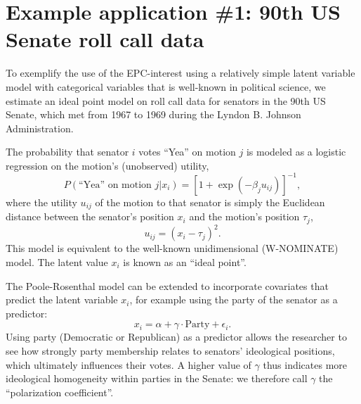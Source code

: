 \documentclass[letterpaper,12pt]{article}
\begin{document}
\section{Example application \#1: 90th US Senate roll call data}
\label{sec:rollcall}

To exemplify the use of the EPC-interest using a relatively simple latent variable model with categorical variables that is well-known in political science, we estimate an ideal point model on roll call data for senators in the 90th US Senate, which met from 1967 to 1969 during the Lyndon B. Johnson Administration. 

The probability that senator $i$ votes ``Yea'' on motion $j$ is modeled as a logistic regression on the motion's (unobserved) utility, 
\begin{equation}
	P(\text{``Yea'' on motion } j | x_i) = [1 + \exp(-\beta_j u_{ij})]^{-1},
	\label{eq:vote-nodif}
\end{equation}
where the utility $u_{ij}$ of the motion to that senator is simply the Euclidean distance between the senator's position $x_i$ and the motion's position $\tau_j$,
\begin{equation}
	u_{ij} = (x_{i} - \tau_{j})^2.
\end{equation}
This model is equivalent to the well-known unidimensional \citet{poole1985spatial} (W-NOMINATE) model. The latent value $x_i$ is known  as an ``ideal point''. 

The Poole-Rosenthal model can be extended to incorporate covariates that predict the latent variable $x_i$, for example using the party of the senator as a predictor: 
\begin{equation}
	x_i = \alpha + \gamma \cdot \text{Party} + \epsilon_i.
	\label{eq:party-dimension}
\end{equation}
Using party (Democratic or Republican) as a predictor allows the researcher to see how strongly  party membership relates to  senators' ideological positions, which ultimately influences their votes. A higher value of $\gamma$ thus indicates more ideological homogeneity  within parties in the Senate: we therefore call $\gamma$ the ``polarization coefficient''.  
\end{document}

